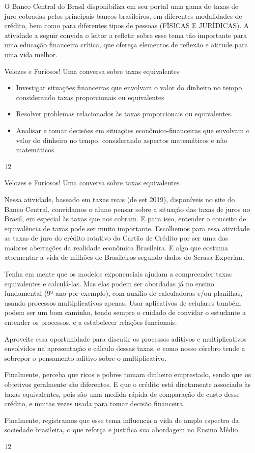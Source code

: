 O Banco Central do Brasil disponibiliza em seu portal uma gama de taxas de juro cobradas pelos principais bancos brasileiros, em diferentes modalidades de crédito, bem como para diferentes tipos de pessoas (FÍSICAS E JURÍDICAS). A atividade a seguir convida o leitor a refletir sobre esse tema tão importante para uma educação financeira crítica, que ofereça elementos de reflexão e atitude para uma vida melhor. 
\clearpage
\begin{objectives}{Velozes e Furiosos! Uma conversa sobre taxas equivalentes}
{
\begin{itemize}
\item Investigar situações financeiras que envolvam o valor do dinheiro no tempo, considerando taxas proporcionais ou equivalentes
\item Resolver problemas relacionados às taxas proporcionais ou equivalentes.
\item Analisar e tomar decisões em situações econômico-financeiras que envolvam o valor do dinheiro no tempo, considerando aspectos matemáticos e não matemáticos.
\end{itemize}
}{1}{2}
\end{objectives}
\marginpar{\vspace{-2.5em}}
\begin{sugestions}{Velozes e Furiosos! Uma conversa sobre taxas equivalentes}
{
Nessa atividade, baseado em taxas reais (de set 2019), disponíveis no site do Banco Central, convidamos o aluno pensar sobre a situação das taxas de juros no Brasil, em especial às taxas que nos cobram. E para isso, entender o conceito de equivalência de taxas pode ser muito importante. Escolhemos para essa atividade as taxas de juro do crédito rotativo do Cartão de Crédito por ser uma das maiores aberrações da realidade econômica Brasileira. E algo que costuma atormentar a vida de milhões de Brasileiros segundo dados do Serasa Experian. 

Tenha em mente que os modelos exponenciais ajudam a compreender taxas equivalentes e calculá-las. Mas elas podem ser abordadas já no ensino fundamental (9º ano por exemplo), com auxílio de calculadoras e/ou planilhas, usando processos multiplicativos apenas. Usar aplicativos de celulares também podem ser um bom caminho, tendo sempre o cuidado de convidar o estudante a entender os processos, e a estabelecer relações funcionais. 

Aproveite essa oportunidade para discutir os processos aditivos e multiplicativos envolvidos na apresentação e cálculo dessas taxas, e como nosso cérebro tende a sobrepor o pensamento aditivo sobre o multiplicativo. 

Finalmente, perceba que ricos e pobres tomam dinheiro emprestado, sendo que os objetivos geralmente são diferentes. E que o crédito está diretamente associado às taxas equivalentes, pois são uma medida rápida de comparação de custo desse crédito, e muitas vezes usada para tomar decisão financeira. 

Finalmente, registramos que esse tema influencia a vida de amplo espectro da sociedade brasileira, o que reforça e justifica sua abordagem no Ensino Médio. 

}{1}{2}
\end{sugestions}
